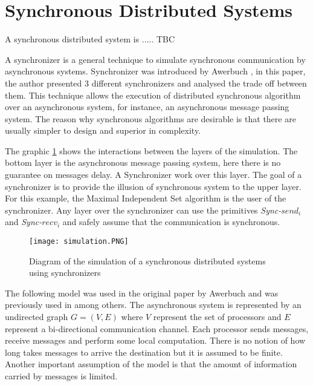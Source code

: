 \section{Synchronous Distributed Systems}
\label{chap:3}

A synchronous distributed system is ..... TBC

A synchronizer is a general technique to simulate synchronous communication by asynchronous systems. Synchronizer was introduced by Awerbuch \cite{awerbuch1985complexity}, in this paper, the author presented 3 different synchronizers and analysed the trade off between them. This technique allows the execution of distributed synchronous algorithm over an asynchronous system, for instance, an asynchronous message passing system. The reason why synchronous algorithms are desirable is that there are usually simpler to design and superior in complexity. 

The graphic \ref{fig:simulation} shows the interactions between the layers of the simulation. The bottom layer is the asynchronous message passing system, here there is no guarantee on messages delay. A Synchronizer work over this layer. The goal of a synchronizer is to provide the illusion of synchronous system to the upper layer. For this example, the Maximal Independent Set algorithm is the user of the synchronizer. Any layer over the synchronizer can use the primitives \textit{Sync-}$send_i$ and \textit{Sync-}$recv_i$ and safely assume that the communication is synchronous.      

\begin{figure}[ht]
\centering
\texttt{[image: simulation.PNG]} 
\caption{Diagram of the simulation of a synchronous distributed systems using synchronizers}
\label{fig:simulation}
\end{figure}


The following model was used in the original paper by Awerbuch \cite{awerbuch1985complexity} and was previously used in \cite{segall1983distributed,gallager1982distributed} among others. The asynchronous system is represented by an undirected graph $G = (V,E)$ where $V$ represent the set of processors and $E$ represent a bi-directional communication channel. Each processor sends messages, receive messages and perform some local computation. There is no notion of how long takes messages to arrive the destination but it is assumed to be finite. Another important assumption of the model is that the amount of information carried by messages is limited.

